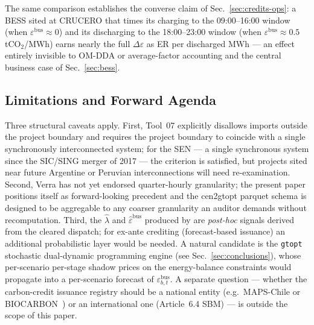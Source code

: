 \begin{table}[t]
\centering
\caption{Daily and annualised CO$_2$ credits for a hypothetical
100~MW PV at CRUCERO 220~kV under three accounting variants.
Annual figures are daily $\times 365$ without seasonality
correction; see~Sec.~\ref{sec:credits-limits}.}
\label{tab:credits-worked}

\end{table}

The same comparison establishes the converse claim of
Sec.~\ref{sec:credits-ops}: a BESS sited at CRUCERO that times its
charging to the 09:00--16:00 window (when
$\varepsilon^{\mathrm{bus}}\approx 0$) and its discharging to the
18:00--23:00 window (when $\varepsilon^{\mathrm{bus}}\approx 0.5$
tCO$_2$/MWh) earns nearly the full $\Delta\varepsilon$ as ER per
discharged MWh — an effect entirely invisible to OM-DDA or
average-factor accounting and the central business case of
Sec.~\ref{sec:bess}.

\subsection{Limitations and Forward Agenda}
\label{sec:credits-limits}

Three structural caveats apply.  First, Tool~07 explicitly
disallows imports outside the project boundary and requires the
project boundary to coincide with a single synchronously
interconnected system; for the SEN — a single synchronous system
since the SIC/SING merger of 2017 — the criterion is satisfied, but
projects sited near future Argentine or Peruvian interconnections
will need re-examination.  Second, Verra has not yet endorsed
quarter-hourly granularity; the present paper positions itself as
forward-looking precedent and the cen2gtopt parquet schema is
designed to be aggregable to any coarser granularity an auditor
demands without recomputation.  Third, the $\hat\lambda$ and
$\hat\varepsilon^{\mathrm{bus}}$ produced by \cenpipe{} are
\emph{post-hoc} signals derived from the cleared dispatch; for
ex-ante crediting (forecast-based issuance) an additional
probabilistic layer would be needed.  A natural candidate is the
\texttt{gtopt} stochastic dual-dynamic programming engine
(see Sec.~\ref{sec:conclusions}), whose per-scenario per-stage
shadow prices on the energy-balance constraints would propagate
into a per-scenario forecast of $\varepsilon^{\mathrm{bus}}_{b,t}$.
A separate question — whether the carbon-credit issuance registry
should be a national entity (e.g.\ MAPS-Chile or
BIOCARBON~\cite{BiocarbonRegistry,MAPSChile}) or an international
one (Article~6.4 SBM) — is outside the scope of this paper.

